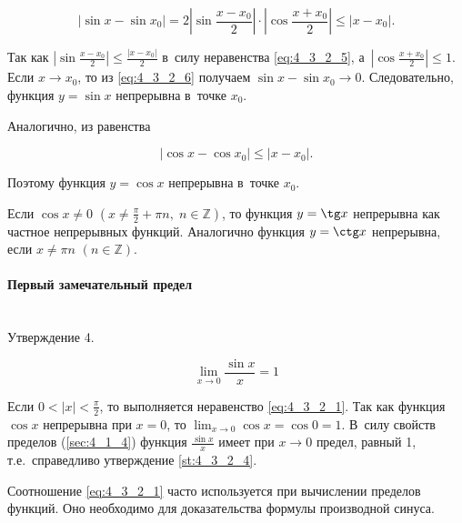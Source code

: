 \begin{equation}\label{eq:4_3_2_6}
\displaystyle \left| \sin x - \sin x_{0} \right| =
2 \left| \sin\frac{x-x_{0}}{2} \right| \cdot
\left| \cos\frac{x+x_{0}}{2}\right| \leqslant \left| x - x_{0} \right|.
\end{equation}

\noindent
Так как 
$\displaystyle  \left| \sin\frac{x-x_{0}}{2}\right| \leqslant \frac{\left| x - x_{0} \right|}{2}$
в~силу неравенства \eqref{eq:4_3_2_5}, а~$\left| \cos \frac{x+x_{0}}{2} \right| \leqslant 1$.
Если $x \to x_{0}$, то из \eqref{eq:4_3_2_6} получаем $\sin x - \sin x_{0} \to 0$.
Следовательно, функция $y = \sin x$ непрерывна в~точке $x_{0}$.

Аналогично, из равенства

\begin{equation*}
\left| \cos x - \cos x_{0} \right| \leqslant \left| x - x_{0} \right|.
\end{equation*}

\noindent
Поэтому функция $y = \cos x$ непрерывна в~точке $x_{0}$.

Если $\cos x \ne 0$
$\displaystyle \left( x \ne \frac{\pi}{2} + \pi n, \; n \in \mathbb{Z} \right)$,
то функция $y = \tg x$ непрерывна как частное непрерывных функций.
Аналогично функция $y = \ctg x$ непрерывна, если $x \ne \pi n$ $(n \in \mathbb{Z})$.


\paragraph{Первый замечательный предел}\mbox{} \\

Утверждение 4.\label{st:4_3_2_4}
 
\begin{equation}\label{eq:4_3_2_7}
\displaystyle \lim_{x \to 0} \frac{\sin x}{x} = 1
\end{equation}

Если $\displaystyle 0 < |x| < \frac{\pi}{2}$, то выполняется неравенство \eqref{eq:4_3_2_1}.
Так как функция $\cos x$ непрерывна при $x = 0$, то 
$\displaystyle \lim_{x \to 0} \cos x = \cos 0 = 1$.
В~силу свойств пределов (\ref{sec:4_1_4}) функция $\displaystyle \frac{\sin x}{x}$ имеет
при $x \to 0$ предел, равный 1, т.е.\ справедливо утверждение \ref{st:4_3_2_4}.

\begin{Note}\label{nt:4_3_2_1} Соотношение \eqref{eq:4_3_2_1} часто используется
при вычислении пределов функций.
Оно необходимо для доказательства формулы производной синуса.
\end{Note}

